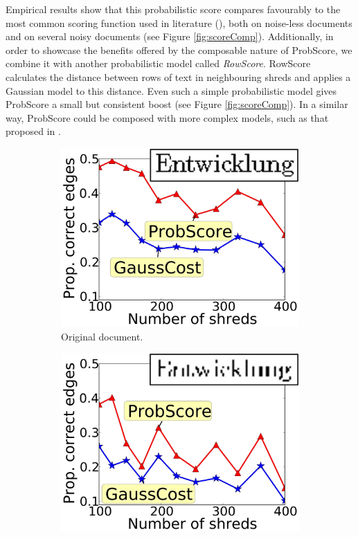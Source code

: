 \documentclass{llncs}
\begin{document}
Empirical results show that this probabilistic score compares favourably to the most common scoring function used in literature (\cite{P7}), both on noise-less documents and on several noisy documents (see Figure \ref{fig:scoreComp}). Additionally, in order to showcase the benefits offered by the composable nature of ProbScore, we combine it with another probabilistic model called \emph{RowScore}. RowScore calculates the distance between rows of text in neighbouring shreds and applies a Gaussian model to this distance. Even such a simple probabilistic model gives ProbScore a small but consistent boost (see Figure \ref{fig:scoreComp}). In a similar way, ProbScore could be composed with more complex models, such as that proposed in \cite{P8}.
\begin{figure}[h]
    \setlength{\abovecaptionskip}{4pt plus 1.0pt minus 2.0pt}
    \centering
    \begin{subfigure}[b]{0.48\textwidth}
        \setlength{\abovecaptionskip}{1pt plus 1.0pt minus 2.0pt}
        \centering
        \includegraphics[width=\textwidth]{origCompEnt300.jpg}
        \caption{Original document.}
    \end{subfigure}
    \begin{subfigure}[b]{0.48\textwidth}
        \setlength{\abovecaptionskip}{1pt plus 1.0pt minus 2.0pt}
        \centering
        \includegraphics[width=\textwidth]{downsampleCompEnt300.jpg}

\end{subfigure}
\end{figure}
\end{document}
